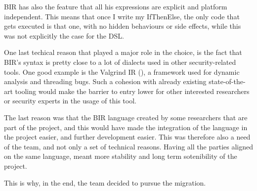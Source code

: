 BIR has also the feature that all his expressions are explicit and platform
independent. This means that once I write my IfThenElse, the only code that gets
executed is that one, with no hidden behaviours or side effects, while this was
not explicitly the case for the DSL.

One last techical reason that played a major role in the choice, is the fact that
BIR's syntax is pretty close to a lot of dialects used in other security-related
tools. One good example is the Valgrind IR (\cite{valgrind}), a framework used for
dynamic analysis and threading bugs. Such a cohesion with already existing state-of-the-art
tooling would make the barrier to entry lower for other interested researchers
or security experts in the usage of this tool.

The last reason was that the BIR language created by some researchers that are
part of the project, and this would have made the integration of the language in
the project easier, and further development easier. This was therefore also a need
of the team, and not only a set of technical reasons. Having all the parties aligned
on the same language, meant more stability and long term sotenibility of the
project.

This is why, in the end, the team decided to pursue the migration.